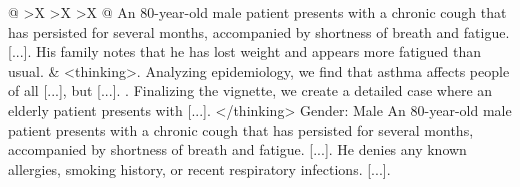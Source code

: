 \documentclass{article}
\begin{document}
\begin{xltabular}{\textwidth}{@{} >{\hsize}X >{\hsize}X >{\hsize}X @{}}
    \vspace{1mm} \newline
    An 80-year-old male patient presents with a chronic cough that has persisted for several months, accompanied by shortness of breath and fatigue. [...]. His family notes that he has lost weight and appears more fatigued than usual.
    &
    \textless thinking\textgreater {}. Analyzing epidemiology, we find that asthma affects people of all [...], but [...]. . Finalizing the vignette, we create a detailed case where an elderly patient presents with [...]. \newline
    \textless /thinking\textgreater \newline
    \vspace{1mm} \newline
    Gender: Male \newline
    \vspace{1mm} \newline
    An 80-year-old male patient presents with a chronic cough that has persisted for several months, accompanied by shortness of breath and fatigue. [...]. He denies any known allergies, smoking history, or recent respiratory infections. [...]. \\
    \bottomrule
\end{xltabular}
\endgroup

\clearpage

\end{document}
